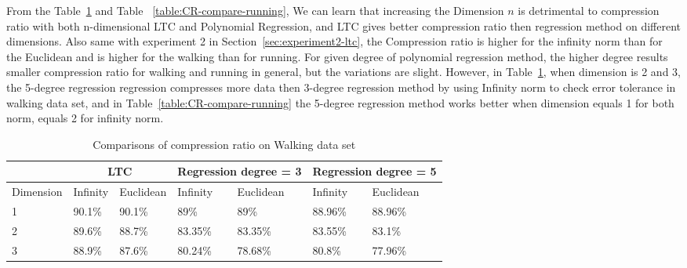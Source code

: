 From the Table~\ref{table:CR-compare-walking} and Table ~\ref{table:CR-compare-running}, We can learn that increasing the Dimension $n$ is detrimental to compression ratio with both n-dimensional LTC and Polynomial Regression, and LTC gives better compression ratio then regression method on different dimensions. Also same with experiment 2 in Section~\ref{sec:experiment2-ltc}, the Compression ratio is higher for the infinity norm than for the Euclidean and is higher for the walking than for running.
For given degree of polynomial regression method, the higher degree results smaller compression ratio for walking and running in general, but the variations are slight. However, in Table~\ref{table:CR-compare-walking}, when dimension is 2 and 3, the 5-degree regression regression compresses more data then 3-degree regression method by using Infinity norm to check error tolerance in walking data set, and in Table~\ref{table:CR-compare-running} the 5-degree regression method works better when dimension equals 1 for both norm, equals 2 for infinity norm.



\begin{table}[]
\begin{tabular}{|l|l|l|l|l|l|l|l|}
\hline
           & \multicolumn{2}{c|}{LTC} & \multicolumn{2}{c|}{Regression degree = 3} & \multicolumn{3}{l|}{Regression degree = 5}\\ \hline
Dimension & Infinity   & Euclidean   & Infinity    & Euclidean     & Infinity      & \multicolumn{2}{l|}{Euclidean} \\ \hline
1          & 90.1\%     & 90.1\%      & 89\%        & 89\%          & 88.96\%       & \multicolumn{2}{l|}{88.96\%}   \\ \hline
2          & 89.6\%     & 88.7\%      & 83.35\%     & 83.35\%       & 83.55\%       & \multicolumn{2}{l|}{83.1\%}    \\ \hline
3          & 88.9\%     & 87.6\%      & 80.24\%     & 78.68\%       & 80.8\%        & \multicolumn{2}{l|}{77.96\%}   \\ \hline
\end{tabular}
\caption{Comparisons of compression ratio on Walking data set }
\label{table:CR-compare-walking}
\end{table}



